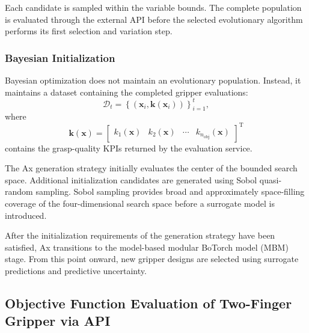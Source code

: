 Each candidate is sampled within the variable bounds. The complete population is evaluated through
the external API before the selected evolutionary algorithm performs its first selection and
variation step.

\subsubsection{Bayesian Initialization}

Bayesian optimization does not maintain an evolutionary population. Instead, it maintains a dataset
containing the completed gripper evaluations:
\begin{equation}
    \mathcal{D}_t
    =
    \left\{
        \left(
            \mathbf{x}_i,
            \mathbf{k}(\mathbf{x}_i)
        \right)
    \right\}_{i=1}^{t},
\end{equation}
where
\begin{equation}
    \mathbf{k}(\mathbf{x})
    =
    \begin{bmatrix}
        k_1(\mathbf{x}) &
        k_2(\mathbf{x}) &
        \cdots &
        k_{n_{\text{obj}}}(\mathbf{x})
    \end{bmatrix}^{\mathrm{T}}
\end{equation}
contains the grasp-quality KPIs returned by the evaluation service.

The Ax generation strategy initially evaluates the center of the bounded search space. Additional
initialization candidates are generated using Sobol quasi-random sampling. Sobol sampling provides
broad and approximately space-filling coverage of the four-dimensional search space before a
surrogate model is introduced.

After the initialization requirements of the generation strategy have been satisfied, Ax transitions
to the model-based modular BoTorch model (MBM) stage. From this point onward, new gripper designs are selected using
surrogate predictions and predictive uncertainty.

\subsection{Objective Function Evaluation of Two-Finger Gripper via API}
\label{sec:two_finger_api_evaluation}

